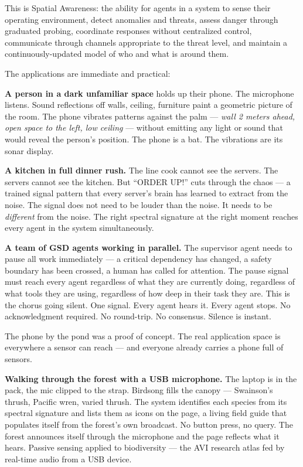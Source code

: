 \documentclass[11pt,letterpaper]{article}
\begin{document}
This is Spatial Awareness: the ability for agents in a system to sense their operating environment, detect anomalies and threats, assess danger through graduated probing, coordinate responses without centralized control, communicate through channels appropriate to the threat level, and maintain a continuously-updated model of who and what is around them.

The applications are immediate and practical:

\textbf{A person in a dark unfamiliar space} holds up their phone. The microphone listens. Sound reflections off walls, ceiling, furniture paint a geometric picture of the room. The phone vibrates patterns against the palm --- \textit{wall 2 meters ahead, open space to the left, low ceiling} --- without emitting any light or sound that would reveal the person's position. The phone is a bat. The vibrations are its sonar display.

\textbf{A kitchen in full dinner rush.} The line cook cannot see the servers. The servers cannot see the kitchen. But ``ORDER UP!'' cuts through the chaos --- a trained signal pattern that every server's brain has learned to extract from the noise. The signal does not need to be louder than the noise. It needs to be \textit{different} from the noise. The right spectral signature at the right moment reaches every agent in the system simultaneously.

\textbf{A team of GSD agents working in parallel.} The supervisor agent needs to pause all work immediately --- a critical dependency has changed, a safety boundary has been crossed, a human has called for attention. The pause signal must reach every agent regardless of what they are currently doing, regardless of what tools they are using, regardless of how deep in their task they are. This is the chorus going silent. One signal. Every agent hears it. Every agent stops. No acknowledgment required. No round-trip. No consensus. Silence is instant.

\vspace{0.5em}
The phone by the pond was a proof of concept. The real application space is everywhere a sensor can reach --- and everyone already carries a phone full of sensors.

\textbf{Walking through the forest with a USB microphone.} The laptop is in the pack, the mic clipped to the strap. Birdsong fills the canopy --- Swainson's thrush, Pacific wren, varied thrush. The system identifies each species from its spectral signature and lists them as icons on the page, a living field guide that populates itself from the forest's own broadcast. No button press, no query. The forest announces itself through the microphone and the page reflects what it hears. Passive sensing applied to biodiversity --- the AVI research atlas fed by real-time audio from a USB device.
\end{document}
